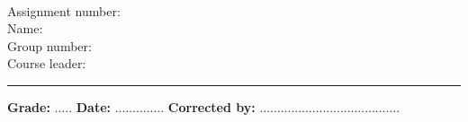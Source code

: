 \thispagestyle{empty}

\textbf{\large\coursenr\ \coursename}

\begin{description}
\item[Assignment number:] \assignmentnr
\item[Name:] \theauthor
\item[Group number:] \groupnr
\item[Course leader:] \courseleader
\end{description}

\rule[0.5ex]{1\columnwidth}{1pt}

\textbf{Grade:} ..... \hfill \textbf{Date:} .............. \hfill \textbf{Corrected
by:} ........................................
